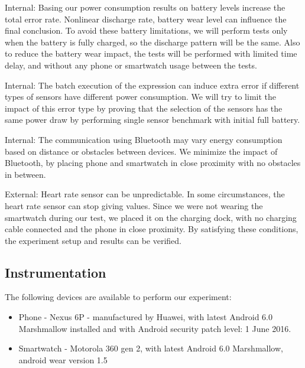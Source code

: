 Internal: Basing our power consumption  results on battery levels increase the total error rate. Nonlinear discharge rate,
battery wear level\cite{battery_wear_proc} can influence the final conclusion. To avoid these battery limitations, we will perform tests only when the battery is fully charged, 
so the discharge pattern will be the same. Also to reduce the battery wear impact, the tests will be performed with limited time delay,
and without any phone or smartwatch usage between the tests.

 Internal: The batch execution of the expression can induce extra error if different types of sensors have different power consumption. 
 We will try to limit the impact of this error type by proving that the selection of the sensors has the same power draw by
 performing single sensor benchmark with initial full battery. 
 
 Internal: The communication using Bluetooth may vary energy consumption based on distance or obstacles between devices.
 We minimize the impact of Bluetooth, by placing phone and smartwatch in close proximity with no obstacles in between.
 
 External: Heart rate sensor can be unpredictable. In some circumstances, the heart rate sensor can stop giving values. 
 Since we were not wearing the smartwatch during our test, we placed it on the charging dock, with no charging cable connected and the phone
 in close proximity. By satisfying these conditions, the experiment setup and results can be verified.
 
 \subsection{Instrumentation}
 The following devices are available to perform our experiment:
 \begin{itemize}
  \item Phone - Nexus 6P - manufactured by Huawei,  with latest Android 6.0 Marshmallow installed and with Android security patch level: 1 June 2016. 
  \item Smartwatch - Motorola 360 gen 2, with latest Android 6.0 Marshmallow, android wear version 1.5 
 \end{itemize}

